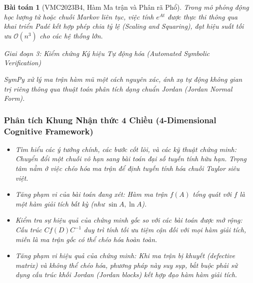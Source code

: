 \documentclass{article}
\newtheorem{baitoan}{Bài toán}
\begin{document}
\begin{baitoan}[VMC2023B4, Hàm Ma trận và Phân rã Phổ]
 Trong mô phỏng động học lượng tử hoặc chuỗi Markov liên tục, việc tính $e^{At}$ được thực thi thông qua khai triển Padé kết hợp phép chia tỷ lệ (Scaling and Squaring), đạt hiệu suất tối ưu $\mathcal{O}(n^3)$ cho các hệ thống lớn.



\vspace{0.5em}\noindent\emph{Giai đoạn 3: Kiểm chứng Ký hiệu Tự động hóa (Automated Symbolic Verification)}
 
 \textsf{SymPy} xử lý ma trận hàm mũ một cách nguyên xác, ánh xạ tự động không gian trị riêng thông qua thuật toán phân tích dạng chuẩn Jordan (Jordan Normal Form).



 \subsubsection*{Phân tích Khung Nhận thức 4 Chiều (4-Dimensional Cognitive Framework)}
 \begin{itemize}
 \item \textit{Tìm hiểu các ý tưởng chính, các bước cốt lõi, và các kỹ thuật chứng minh}: Chuyển đổi một chuỗi vô hạn sang bài toán đại số tuyến tính hữu hạn. Trọng tâm nằm ở việc chéo hóa ma trận để định tuyến tính hóa chuỗi Taylor siêu việt.
 \item \textit{Tăng phạm vi của bài toán đang xét}: Hàm ma trận $f(A)$ tổng quát với $f$ là một hàm giải tích bất kỳ (như $\sin A, \ln A$).
 \item \textit{Kiểm tra sự hiệu quả của chứng minh gốc so với các bài toán được mở rộng}: Cấu trúc $C f(D) C^{-1}$ duy trì tính tối ưu tiệm cận đối với mọi hàm giải tích, miễn là ma trận gốc có thể chéo hóa hoàn toàn.
 \item \textit{Tăng phạm vi hiệu quả của chứng minh}: Khi ma trận bị khuyết (defective matrix) và không thể chéo hóa, phương pháp này suy sụp, bắt buộc phải sử dụng cấu trúc khối Jordan (Jordan blocks) kết hợp đạo hàm hàm giải tích.
 \end{itemize}
\end{baitoan}

\end{document}
